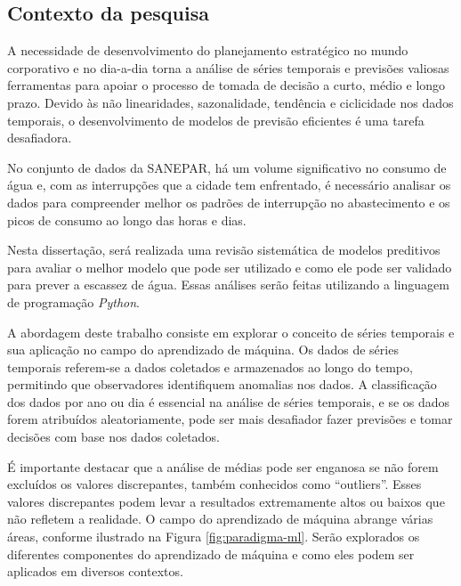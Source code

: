 \subsection{Contexto da pesquisa} \label{subsec:contexto}
 A necessidade de desenvolvimento do planejamento estratégico no mundo corporativo e no dia-a-dia torna a análise de séries temporais e previsões valiosas ferramentas para apoiar o processo de tomada de decisão a curto, médio e longo prazo. Devido às não linearidades, sazonalidade, tendência e ciclicidade nos dados temporais, o desenvolvimento de modelos de previsão eficientes é uma tarefa desafiadora.

No conjunto de dados da SANEPAR, há um volume significativo no consumo de água e, com as interrupções que a cidade tem enfrentado, é necessário analisar os dados para compreender melhor os padrões de interrupção no abastecimento e os picos de consumo ao longo das horas e dias.

Nesta dissertação, será realizada uma revisão sistemática de modelos preditivos para avaliar o melhor modelo que pode ser utilizado e como ele pode ser validado para prever a escassez de água. Essas análises serão feitas utilizando a linguagem de programação \textit{Python}.

A abordagem deste trabalho consiste em explorar o conceito de séries temporais e sua aplicação no campo do aprendizado de máquina. Os dados de séries temporais referem-se a dados coletados e armazenados ao longo do tempo, permitindo que observadores identifiquem anomalias nos dados. A classificação dos dados por ano ou dia é essencial na análise de séries temporais, e se os dados forem atribuídos aleatoriamente, pode ser mais desafiador fazer previsões e tomar decisões com base nos dados coletados.

É importante destacar que a análise de médias pode ser enganosa se não forem excluídos os valores discrepantes, também conhecidos como ``outliers''. Esses valores discrepantes podem levar a resultados extremamente altos ou baixos que não refletem a realidade.
O campo do aprendizado de máquina abrange várias áreas, conforme ilustrado na Figura \ref{fig:paradigma-ml}. Serão explorados os diferentes componentes do aprendizado de máquina e como eles podem ser aplicados em diversos contextos.
 
